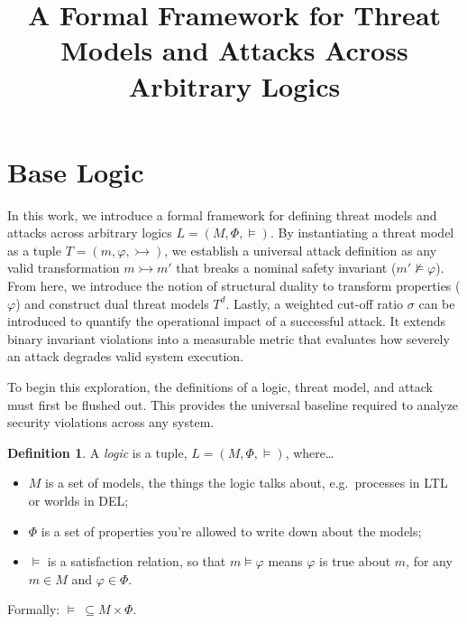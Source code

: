 \documentclass[11pt]{amsart}
\title{A Formal Framework for Threat Models and Attacks Across Arbitrary Logics}
\author{}
\date{}
\theoremstyle{definition}
\newtheorem{definition}{Definition}
\theoremstyle{remark}
\newcommand{\nsat}{\not\models}
\newcommand{\adv}{\rightarrowtail}   %
\begin{document}
\maketitle

\section{Base Logic}

In this work, we introduce a formal framework for defining threat models and attacks across arbitrary
logics $L = (M, \Phi, \models)$. By instantiating a threat model as a tuple $T = (m, \varphi, \adv)$, we establish a universal
attack definition as any valid transformation $m \adv m'$ that breaks a nominal safety invariant ($m' \nsat \varphi$).
From here, we introduce the notion of structural duality to transform properties ($\varphi$) and construct dual
threat models $T^{d}$. Lastly, a weighted cut-off ratio $\sigma$ can be introduced to quantify the operational impact of
a successful attack. %
It extends binary invariant violations into a measurable metric that evaluates how
severely an attack degrades valid system execution.

To begin this exploration, the definitions of a logic, threat model, and attack must first be flushed out.
This provides the universal baseline required to analyze security violations across any system.

\begin{definition}
A \emph{logic} is a tuple, $L = (M, \Phi, \models)$, where\ldots
\begin{itemize}
  \item $M$ is a set of models, the things the logic talks about, e.g.\ processes in LTL or worlds in DEL;
  \item $\Phi$ is a set of properties you're allowed to write down about the models;
  \item $\models$ is a satisfaction relation, so that $m \models \varphi$ means $\varphi$ is true about $m$, for any $m \in M$ and $\varphi \in \Phi$.
\end{itemize}
Formally: $\models\ \subseteq M \times \Phi$.
\end{definition}
\end{document}

